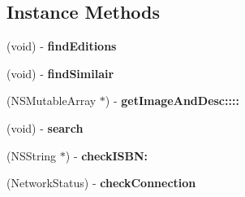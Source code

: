 \subsection*{Instance Methods}
\begin{DoxyCompactItemize}
\item 
(void) -\/ {\bfseries find\+Editions}\label{interface_search_af8514e0651d63b7c09faefddb6757dea}

\item 
(void) -\/ {\bfseries find\+Similair}\label{interface_search_a6978268d6c1d71fe36aca04cf6c190f6}

\item 
(N\+S\+Mutable\+Array $\ast$) -\/ {\bfseries get\+Image\+And\+Desc\+::::}\label{interface_search_aa96064736366ce2b85499d0e3800b348}

\item 
(void) -\/ {\bfseries search}\label{interface_search_ae5e5f19a4e800c76823c0781d3cad215}

\item 
(N\+S\+String $\ast$) -\/ {\bfseries check\+I\+S\+B\+N\+:}\label{interface_search_aa221a1145cdaf40c008f25c8ba795e92}

\item 
(Network\+Status) -\/ {\bfseries check\+Connection}\label{interface_search_a296ad648ed932881f08849d95a5d5c95}

\end{DoxyCompactItemize}
